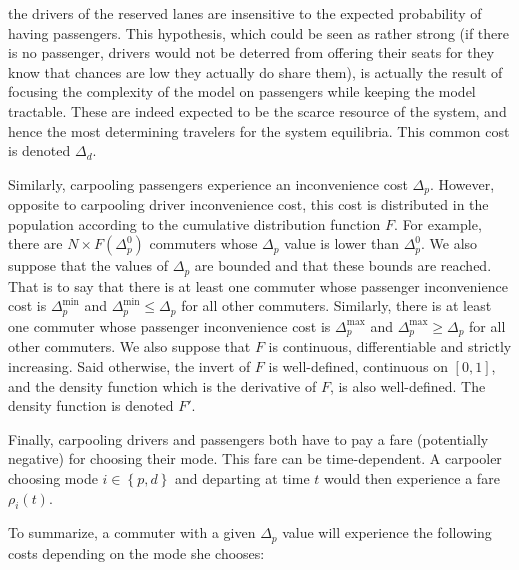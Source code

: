 \documentclass[english, a4paper]{article}
\theoremstyle{plain}
\theoremstyle{definition}
\theoremstyle{remark}
\begin{document}
the drivers of the reserved lanes are insensitive to the expected probability of having passengers. This hypothesis, which could be seen as rather strong (if there is no passenger, drivers would not be deterred from offering their seats for they know that chances are low they actually do share them), is actually the result of focusing the complexity of the model on passengers while keeping the model tractable. These are indeed expected to be the scarce resource of the system, and hence the most determining travelers for the system equilibria.  %
This common cost is denoted $\Delta _d$.

Similarly, carpooling passengers experience an inconvenience cost $\Delta _p$. However, opposite to carpooling driver inconvenience cost, this cost is distributed in the population according to the cumulative distribution function $F$. For example, there are $N \times F(\Delta _p ^0)$ commuters whose $\Delta _p$ value is lower than $\Delta _p ^0$. We also suppose that the values of $\Delta _p$ are bounded and that these bounds are reached. That is to say that there is at least one commuter whose passenger inconvenience cost is $\Delta _p ^{\text{min}}$ and $\Delta _p^{\text{min}} \leq \Delta _p$ for all other commuters. Similarly, there is at least one commuter whose passenger inconvenience cost is $\Delta _p ^{\text{max}}$ and $\Delta _p^{\text{max}} \geq \Delta _p$ for all other commuters. We also suppose that $F$ is continuous, differentiable and strictly increasing. Said otherwise, the invert of $F$ is well-defined, continuous on $[0, 1]$, and the density function which is the derivative of $F$, is also well-defined. The density function is denoted $F'$.

Finally, carpooling drivers and passengers both have to pay a fare (potentially negative) for choosing their mode. This fare can be time-dependent. A carpooler choosing mode $i \in \left\{ p, d \right\}$ and departing at time $t$ would then experience a fare $\rho _i (t)$.

To summarize, a commuter with a given $\Delta _p$ value will experience the following costs depending on the mode she chooses:

\end{document}
